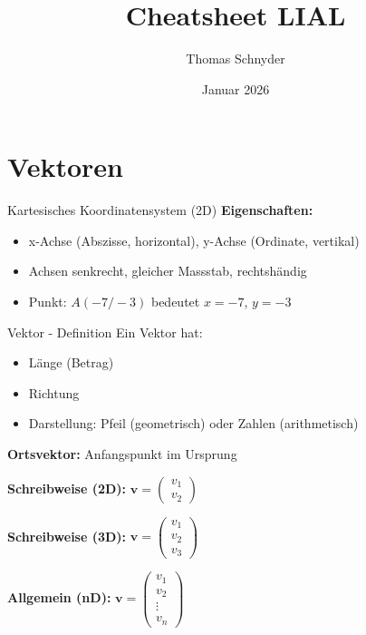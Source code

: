 \documentclass[a4paper, fontsize=7pt]{scrartcl}
\title{Cheatsheet LIAL}
\author{Thomas Schnyder}
\date{Januar 2026}
\begin{document}
\maketitle

\section{Vektoren}

\begin{mainbox}{Kartesisches Koordinatensystem (2D)}
\textbf{Eigenschaften:}
\begin{itemize}
    \item x-Achse (Abszisse, horizontal), y-Achse (Ordinate, vertikal)
    \item Achsen senkrecht, gleicher Massstab, rechtshändig
    \item Punkt: $A(-7/-3)$ bedeutet $x=-7$, $y=-3$
\end{itemize}
\end{mainbox}

\begin{mainbox}{Vektor - Definition}
Ein Vektor hat:
\begin{itemize}
    \item Länge (Betrag)
    \item Richtung
    \item Darstellung: Pfeil (geometrisch) oder Zahlen (arithmetisch)
\end{itemize}

\textbf{Ortsvektor:} Anfangspunkt im Ursprung

\textbf{Schreibweise (2D):} $\mathbf{v} = \begin{pmatrix} v_1 \\ v_2 \end{pmatrix}$

\textbf{Schreibweise (3D):} $\mathbf{v} = \begin{pmatrix} v_1 \\ v_2 \\ v_3 \end{pmatrix}$

\textbf{Allgemein (nD):} $\mathbf{v} = \begin{pmatrix} v_1 \\ v_2 \\ \vdots \\ v_n \end{pmatrix}$
\end{mainbox}
\end{document}
